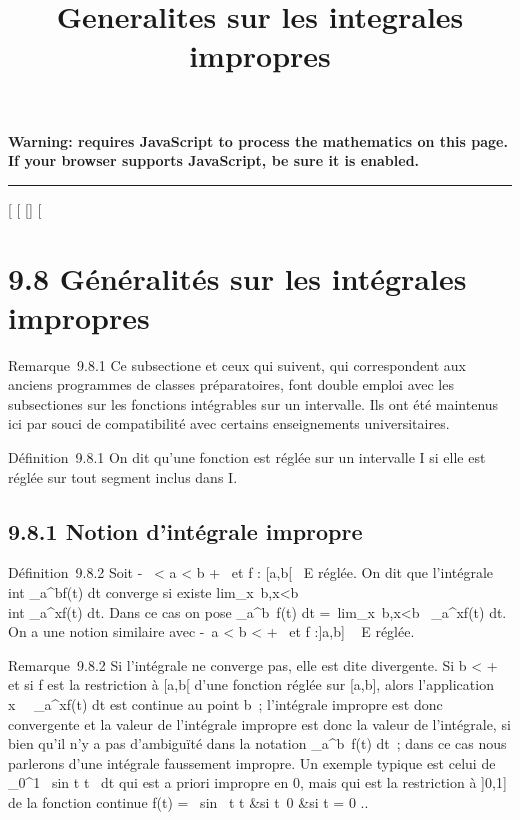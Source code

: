 \documentclass[]{article}
\title{Generalites sur les integrales impropres}
\author{}
\date{}
\begin{document}
\maketitle

\textbf{Warning: 
requires JavaScript to process the mathematics on this page.\\ If your
browser supports JavaScript, be sure it is enabled.}

\begin{center}\rule{3in}{0.4pt}\end{center}

[
[
[]
[

\section{9.8 Généralités sur les intégrales impropres}

Remarque~9.8.1 Ce subsectione et ceux qui suivent, qui correspondent aux
anciens programmes de classes préparatoires, font double emploi avec les
subsectiones sur les fonctions intégrables sur un intervalle. Ils ont été
maintenus ici par souci de compatibilité avec certains enseignements
universitaires.

Définition~9.8.1 On dit qu'une fonction est réglée sur un intervalle I
si elle est réglée sur tout segment inclus dans I.

\subsection{9.8.1 Notion d'intégrale impropre}

Définition~9.8.2 Soit -\infty~ < a < b \leq +\infty~ et f :
[a,b[\rightarrow~ E réglée. On dit que l'intégrale \\int
 _a^bf(t) dt converge si existe
lim_x\rightarrow~b,x<b~\\int
 _a^xf(t) dt. Dans ce cas on pose
\int  _a^b~f(t) dt
=\
lim_x\rightarrow~b,x<b\int ~
_a^xf(t) dt. On a une notion similaire avec -\infty~\leq a
< b < +\infty~ et f :]a,b] \rightarrow~ E réglée.

Remarque~9.8.2 Si l'intégrale ne converge pas, elle est dite divergente.
Si b < +\infty~ et si f est la restriction à [a,b[ d'une
fonction réglée sur [a,b], alors l'application
x\mapsto~\int ~
_a^xf(t) dt est continue au point b~; l'intégrale impropre
est donc convergente et la valeur de l'intégrale impropre est donc la
valeur de l'intégrale, si bien qu'il n'y a pas d'ambiguïté dans la
notation \int  _a^b~f(t) dt~; dans
ce cas nous parlerons d'une intégrale faussement impropre. Un exemple
typique est celui de \int  _0^1~
sin t \over t~ dt qui est a
priori impropre en 0, mais qui est la restriction à ]0,1] de la
fonction continue f(t) = \left \
\cases  sin~ t
\over t &si t\neq~0
 &si t = 0 \cr 
\right ..
\end{document}
